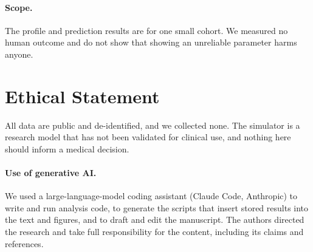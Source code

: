 \documentclass[letterpaper]{article} %
\begin{document}
\paragraph{Scope.} The profile and prediction results are for one small cohort. We measured no human outcome and do not show that showing an unreliable parameter harms anyone.

\section*{Ethical Statement}

All data are public and de-identified, and we collected none. The simulator is a research model that has not been validated for clinical use, and nothing here should inform a medical decision.

\paragraph{Use of generative AI.} We used a large-language-model coding assistant (Claude Code, Anthropic) to write and run analysis code, to generate the scripts that insert stored results into the text and figures, and to draft and edit the manuscript. The authors directed the research and take full responsibility for the content, including its claims and references.


\end{document}
